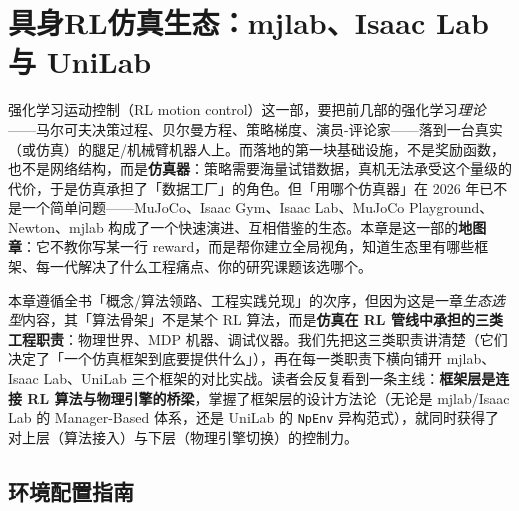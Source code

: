 \chapter{具身RL仿真生态：mjlab、Isaac Lab 与 UniLab}\label{ch:rlmc-ecosystem}


强化学习运动控制（RL motion control）这一部，要把前几部的强化学习\emph{理论}——马尔可夫决策过程、贝尔曼方程、策略梯度、演员-评论家——落到一台真实（或仿真）的腿足/机械臂机器人上。而落地的第一块基础设施，不是奖励函数，也不是网络结构，而是\textbf{仿真器}：策略需要海量试错数据，真机无法承受这个量级的代价，于是仿真承担了「数据工厂」的角色。但「用哪个仿真器」在 2026 年已不是一个简单问题——MuJoCo、Isaac Gym、Isaac Lab、MuJoCo Playground、Newton、mjlab 构成了一个快速演进、互相借鉴的生态。本章是这一部的\textbf{地图章}：它不教你写某一行 reward，而是帮你建立全局视角，知道生态里有哪些框架、每一代解决了什么工程痛点、你的研究课题该选哪个。

本章遵循全书「概念/算法领路、工程实践兑现」的次序，但因为这是一章\emph{生态选型}内容，其「算法骨架」不是某个 RL 算法，而是\textbf{仿真在 RL 管线中承担的三类工程职责}：物理世界、MDP 机器、调试仪器。我们先把这三类职责讲清楚（它们决定了「一个仿真框架到底要提供什么」），再在每一类职责下横向铺开 mjlab、Isaac Lab、UniLab 三个框架的对比实战。读者会反复看到一条主线：\textbf{框架层是连接 RL 算法与物理引擎的桥梁}，掌握了框架层的设计方法论（无论是 mjlab/Isaac Lab 的 Manager-Based 体系，还是 UniLab 的 \texttt{NpEnv} 异构范式），就同时获得了对上层（算法接入）与下层（物理引擎切换）的控制力。

\section*{环境配置指南}
\label{sec:rlmc-eco-setup}

